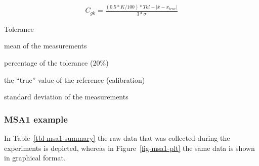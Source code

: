 \documentclass[
  a4paper,
]{scrbook}
\providecommand{\tightlist}{%
  \setlength{\itemsep}{0pt}\setlength{\parskip}{0pt}}\usepackage{longtable,booktabs,array}
\let\olddescription\description
\let\endolddescription\enddescription
\renewenvironment{description}{
          \begin{spacing}{1.5}\olddescription
        }{
          \endolddescription\end{spacing}
        }
\begin{document}
\begin{align}
C_{gk} = \frac{(0.5*K/100)*Tol - |\bar{x}-x_{true}|}{3*\sigma} \label{Cgk}
\end{align}

\begin{description}
\tightlist
\item[\(Tol\)]
Tolerance
\item[\(\bar{x}\)]
mean of the measurements
\item[K]
percentage of the tolerance (\(20\%\))
\item[\(x_{true}\)]
the ``true'' value of the reference (calibration)
\item[\(\sigma\)]
standard deviation of the measurements
\end{description}

\subsubsection{MSA1 example}\label{msa1-example}

\begin{table}

\caption{\label{tbl-msa1-summary}The summary of the raw data for the
MSA1.}


\end{table}%

In Table~\ref{tbl-msa1-summary} the raw data that was collected during
the experiments is depicted, whereas in Figure~\ref{fig-msa1-plt} the
same data is shown in graphical format.
\end{document}
